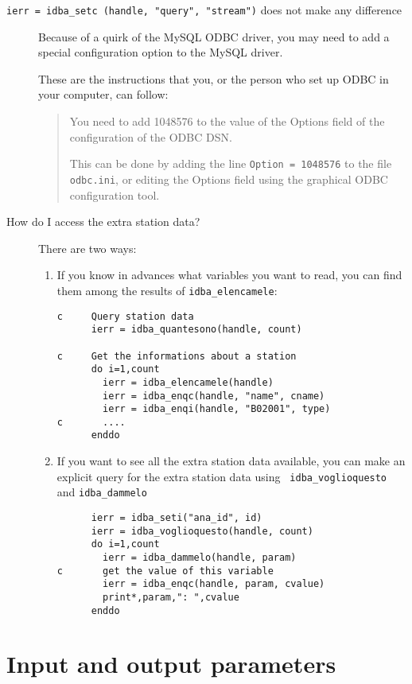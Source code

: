 \documentclass[final,12pt,a4paper,twoside]{book}
\begin{document}
\begin{description}
\item [ {\tt ierr = idba\_setc (handle, "query", "stream")} does not make any difference ]
  Because of a quirk of the MySQL ODBC driver, you may need to add a special
  configuration option to the MySQL driver.
  
  These are the instructions that you, or the person who set up ODBC in your
  computer, can follow:
  \begin{quote}
  You need to add 1048576 to the value of the Options
  field of the configuration of the ODBC DSN.

  This can be done by adding the line {\tt Option = 1048576} to the file {\tt
  odbc.ini}, or editing the Options field using the graphical ODBC
  configuration tool.
  \end{quote}

\item [ How do I access the extra station data? ]
  There are two ways:
  \begin{enumerate}
  \item If you know in advances what variables you want to read, you can find
        them among the results of {\tt idba\_elencamele}:
	\begin{verbatim}
c     Query station data
      ierr = idba_quantesono(handle, count)
   
c     Get the informations about a station
      do i=1,count
        ierr = idba_elencamele(handle)
        ierr = idba_enqc(handle, "name", cname)
        ierr = idba_enqi(handle, "B02001", type)
c       ....
      enddo
	\end{verbatim}
  \item If you want to see all the extra station data available, you can make
	an explicit query for the extra station data using {\tt
	idba\_voglioquesto} and {\tt idba\_dammelo}
	\begin{verbatim}
      ierr = idba_seti("ana_id", id)
      ierr = idba_voglioquesto(handle, count)
      do i=1,count
        ierr = idba_dammelo(handle, param)
c       get the value of this variable
        ierr = idba_enqc(handle, param, cvalue)
        print*,param,": ",cvalue
      enddo
	\end{verbatim}
  \end{enumerate}
\end{description}

\appendix

\chapter{Input and output parameters}
\end{document}
